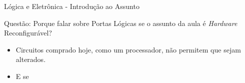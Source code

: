 \documentclass[aspectratio=169]{beamer}
\begin{document}

	
	\begin{frame}{Lógica e Eletrônica - Introdução ao Assunto}
		\begin{block}{Questão: Porque falar sobre Portas Lógicas se o assunto da aula é \textit{Hardware} Reconfigurável?}
			\begin{itemize}
				\item Circuitos comprado hoje, como um processador, não permitem que sejam alterados.
				
				\item E se 
			\end{itemize}
		\end{block}
	\end{frame}
\end{document}
